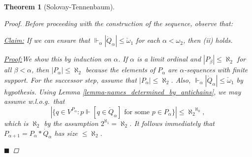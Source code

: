\documentclass[11pt,a4paper]{report}
\newtheorem{theorem}{Theorem}[chapter] %
\theoremstyle{definition}
\theoremstyle{num.custom-title}
\theoremstyle{custom-title}
\newenvironment{claim}[1]{\par\noindent\underline{Claim#1:}\space}{} %
\newenvironment{claimproof}[1]{\par\noindent\underline{Proof:}\space#1}{\leavevmode\unskip\penalty9999 \hbox{}\nobreak\hfill\quad\hbox{$\blacksquare$}} %
\newcommand{\downmapsto}{%
           \mathrel{\raisebox{.1em}{%
							\rotatebox[origin=c]{-90}{$\mapsto$}}}}
\newcommand*{\defeq}{\mathrel{\rlap{%
                     \raisebox{0.3ex}{$\cdot$}}%
                     \raisebox{-0.3ex}{$\cdot$}}%
                     =}
\newcommand{\forces}{\Vdash}
\begin{document}
\begin{theorem}[Solovay-Tennenbaum]
\begin{proof}
Before proceeding with the construction of the sequence, observe that:\\[-10pt]
\begin{claim}{}
If we can ensure that $\forces_\alpha |\dot{Q}_\alpha| \leq \check{\omega}_1$ for each $\alpha < \omega_2$, then (ii) holds.
\begin{claimproof}
We show this by induction on $\alpha$. If $\alpha$ is a limit ordinal and $|P_\beta| \leq \aleph_2$ for all $\beta < \alpha$, then $|P_\alpha| \leq \aleph_2$ because the elements of $P_\alpha$ are $\alpha$-sequences with finite support. For the successor step, assume that $|P_\alpha| \leq \aleph_2$.
Also, $\forces_\alpha |\dot{Q}_\alpha| \leq \check{\omega}_1$ by hypothesis.
Using Lemma \ref{lemma-names_determined_by_antichains}, we may assume w.l.o.g.\ that 
\[
|\{q \in V^{P_\alpha} : p \forces [q \in \dot{Q}_\alpha] \text{ for some } p \in P_\alpha \}| \leq {\aleph_2}^{\aleph_0},
\]
which is $\aleph_2$ by the assumption $2^{\aleph_1} = \aleph_2$. It follows immediately that $P_{\alpha+1} = P_\alpha * \dot{Q}_\alpha$ has size $\leq \aleph_2$.

\end{claimproof}
\end{claim}
\end{proof}
\end{theorem}
\end{document}
